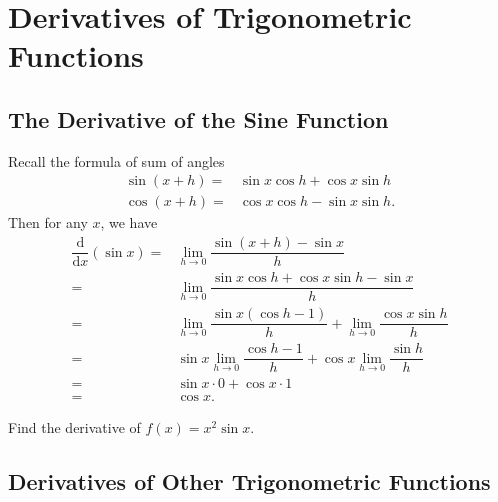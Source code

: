 
\hypertarget{derivatives-of-trigonometric-functions}{%
\section{Derivatives of Trigonometric
Functions}\label{derivatives-of-trigonometric-functions}}

\hypertarget{the-derivative-of-the-sine-function}{%
\subsection{The Derivative of the Sine
Function}\label{the-derivative-of-the-sine-function}}

Recall the formula of sum of angles 
\[
\begin{aligned}
  \sin(x+h)=&\sin x\cos h+\cos x\sin h\\[0.5em]
  \cos(x+h)=&\cos x\cos h-\sin x\sin h.
\end{aligned}
\] Then for any \(x\), we have \[
\begin{aligned}
  \dfrac{\mathrm{d}}{\mathrm{d} x}(\sin x)=&\lim\limits_{h\to 0}\dfrac{\sin(x+h)-\sin x}{h}\\
  =&\lim\limits_{h\to 0}\dfrac{\sin x\cos h+\cos x\sin h-\sin x}{h}\\
  =&\lim\limits_{h\to 0}\dfrac{\sin x(\cos h-1)}{h}+\lim\limits_{h\to 0}\dfrac{\cos x\sin h}{h}\\
  =&\sin x\lim\limits_{h\to 0}\dfrac{\cos h-1}{h}+\cos x\lim\limits_{h\to 0}\dfrac{\sin h}{h}\\
  =&\sin x\cdot 0 +\cos x\cdot 1\\
  =&\cos x.
\end{aligned}
\]

\begin{example}

Find the derivative of \(f(x)=x^2\sin x\).

\end{example}
\vspace*{6\baselineskip}

\hypertarget{derivatives-of-other-trigonometric-functions}{%
\subsection{Derivatives of Other Trigonometric
Functions}\label{derivatives-of-other-trigonometric-functions}}

